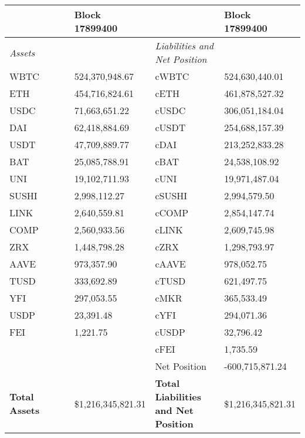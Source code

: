 
\begin{longtable}{@{}p{0.25\linewidth}p{0.25\linewidth}p{0.25\linewidth}p{0.25\linewidth}@{}}

\toprule


& Block 17899400 & & Block 17899400 \\

\midrule
\textit{Assets} & & \textit{Liabilities and Net Position} \\
WBTC & 524,370,948.67 & cWBTC & 524,630,440.01 \\
ETH & 454,716,824.61 & cETH & 461,878,527.32 \\
USDC & 71,663,651.22 & cUSDC & 306,051,184.04 \\
DAI & 62,418,884.69 & cUSDT & 254,688,157.39 \\
USDT & 47,709,889.77 & cDAI & 213,252,833.28 \\
BAT & 25,085,788.91 & cBAT & 24,538,108.92 \\
UNI & 19,102,711.93 & cUNI & 19,971,487.04 \\
SUSHI & 2,998,112.27 & cSUSHI & 2,994,579.50 \\
LINK & 2,640,559.81 & cCOMP & 2,854,147.74 \\
COMP & 2,560,933.56 & cLINK & 2,609,745.98 \\
ZRX & 1,448,798.28 & cZRX & 1,298,793.97 \\
AAVE & 973,357.90 & cAAVE & 978,052.75 \\
TUSD & 333,692.89 & cTUSD & 621,497.75 \\
YFI & 297,053.55 & cMKR & 365,533.49 \\
USDP & 23,391.48 & cYFI & 294,071.36 \\
FEI & 1,221.75 & cUSDP & 32,796.42 \\
 &  & cFEI & 1,735.59 \\
 &  & Net Position & -600,715,871.24 \\

\midrule

\textbf{Total Assets} & \$1,216,345,821.31 & \textbf{Total Liabilities and Net Position} & \$1,216,345,821.31 \\

\bottomrule

\end{longtable}

